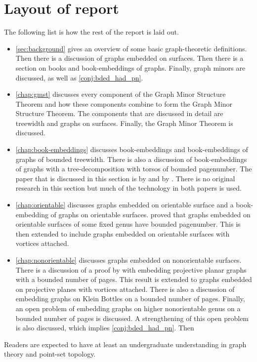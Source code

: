 \section{Layout of report}
The following list is how the rest of the report is laid out. 
\begin{itemize}
	\item \cref{sec:background} gives an overview of some basic graph-theoretic definitions. Then there is a discussion of graphs embedded on surfaces. Then there is a section on books and book-embeddings of graphs. Finally, graph minors are discussed, as well as \cref{conj:bded_had_pn}. 
	\item \cref{chap:gmst} discusses every component of the Graph Minor Structure Theorem and how these components combine to form the Graph Minor Structure Theorem. The components that are discussed in detail are treewidth and graphs on surfaces. Finally, the Graph Minor Theorem is discussed.
	\item \cref{chap:book-embeddings} discusses book-embeddings and book-embeddings of graphs of bounded treewidth. There is also a discussion of book-embeddings of graphs with a tree-decomposition with torsos of bounded pagenumber. The paper that is discussed in this section is by \textcite{hickingbothamStackNumberCliqueSum2023} and by \textcite{ganleyPagenumberTrees2001}. There is no original research in this section but much of the technology in both papers is used. 
	\item \cref{chap:orientable} discusses graphs embedded on orientable surface and a book-embedding of graphs on orientable surfaces. \textcite{heathPagenumberGenusGraphs1992} proved that graphs embedded on orientable surfaces of some fixed genus have bounded pagenumber. This is then extended to include graphs embedded on orientable surfaces with vortices attached. 
	\item \cref{chap:nonorientable} discusses graphs embedded on nonorientable surfaces. There is a discussion of a proof by \textcite{nakamotoBookEmbeddingProjectiveplanar2015} with embedding projective planar graphs with a bounded number of pages. This result is extended to graphs embedded on projective planes with vortices attached. There is also a discussion of embedding graphs on Klein Bottles on a bounded number of pages. Finally, an open problem of embedding graphs on higher nonorientable genus on a bounded number of pages is discussed. A strengthening of this open problem is also discussed, which implies \cref{conj:bded_had_pn}. Then 
\end{itemize}

Readers are expected to have at least an undergraduate understanding in graph theory and point-set topology. 
